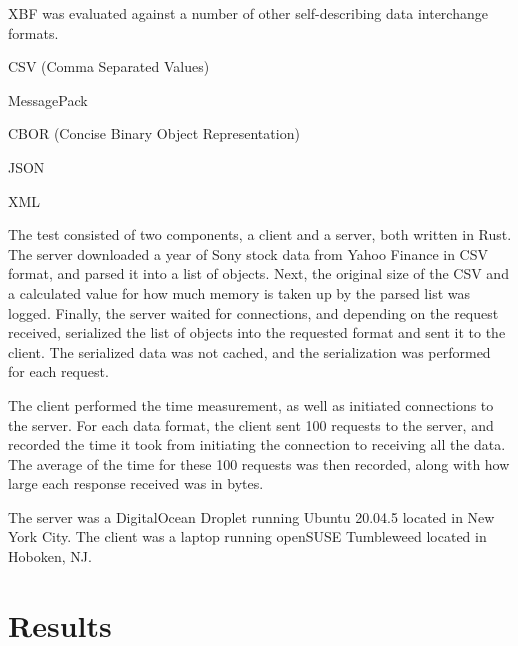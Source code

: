 \documentclass[conference]{IEEEtran}
\begin{document}
XBF was evaluated against a number of other self-describing data interchange formats.

\begin{IEEEitemize}
	\item CSV (Comma Separated Values)\cite{csv_spec}\cite{csv_parser}
	\item MessagePack\cite{msgpack_spec}\cite{msgpack_parser}
	\item CBOR (Concise Binary Object Representation)\cite{cbor_spec}\cite{cbor_parser}
	\item JSON\cite{json_parser}
	\item XML\cite{xml_parser}
\end{IEEEitemize}

The test consisted of two components, a client and a server, both written in Rust. The server downloaded a year of Sony stock data from Yahoo Finance\cite{sony_stock_data} in CSV format, and parsed it into a list of objects. Next, the original size of the CSV and a calculated value for how much memory is taken up by the parsed list was logged. Finally, the server waited for connections, and depending on the request received, serialized the list of objects into the requested format and sent it to the client. The serialized data was not cached, and the serialization was performed for each request.

The client performed the time measurement, as well as initiated connections to the server. For each data format, the client sent 100 requests to the server, and recorded the time it took from initiating the connection to receiving all the data. The average of the time for these 100 requests was then recorded, along with how large each response received was in bytes.

The server was a DigitalOcean Droplet\cite{digital_ocean} running Ubuntu 20.04.5 located in New York City. The client was a laptop running openSUSE Tumbleweed located in Hoboken, NJ.

\section{Results}
\end{document}
